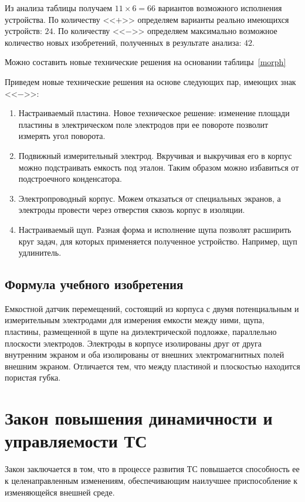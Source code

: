 Из анализа таблицы получаем $11 \times 6 = 66$ вариантов возможного исполнения устройства. По количеству <<$+$>> определяем варианты реально имеющихся устройств: $24$. По количеству <<$-$>> определяем максимально возможное количество новых изобретений, полученных в результате анализа: $42$. 

Можно составить новые технические решения на основании таблицы~\ref{morph} 

Приведем новые технические решения на основе следующих пар, имеющих знак <<$-$>>:
\begin{enumerate}
	\item Настраиваемый пластина. Новое техническое решение: изменение площади пластины в электрическом поле электродов при ее повороте позволит измерять угол поворота.
	\item Подвижный измерительный электрод. Вкручивая и выкручивая его в корпус можно подстраивать емкость под эталон. Таким образом можно избавиться от подстроечного конденсатора.
	\item  Электропроводный корпус. Можем отказаться от специальных экранов, а электроды провести через отверстия сквозь корпус в изоляции.
	\item Настраиваемый щуп. Разная форма и исполнение щупа позволят расширить круг задач, для которых применяется полученное устройство. Например, щуп удлинитель.
\end{enumerate}

\subsection{Формула учебного изобретения}

Емкостной датчик перемещений, состоящий из корпуса с двумя потенциальным и измерительным электродами для измерения емкости между ними, щупа, пластины, размещенной в щупе на диэлектрической подложке, параллельно плоскости электродов. Электроды в корпусе изолированы друг от друга внутренним экраном и оба изолированы от внешних электромагнитных полей внешним экраном. Отличается тем, что между пластиной и плоскостью находится пористая губка.

\section{Закон повышения динамичности и управляемости ТС}

Закон заключается в том, что в процессе развития ТС повышается способность ее к целенаправленным изменениям, обеспечивающим наилучшее приспособление к изменяющейся внешней среде.


